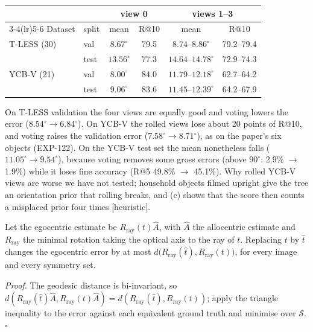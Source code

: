 \begin{center}\scriptsize\setlength{\tabcolsep}{3pt}
\begin{tabular}{@{}llcccc@{}}
\toprule
& & \multicolumn{2}{c}{view 0} & \multicolumn{2}{c}{views 1--3}\\
\cmidrule(lr){3-4}\cmidrule(lr){5-6}
Dataset & split & mean & R@10 & mean & R@10\\
\midrule
T-LESS (30) & val & $8.67^\circ$ & 79.5 & $8.74$--$8.86^\circ$ & 79.2--79.4\\
            & test & $13.56^\circ$ & 77.3 & $14.64$--$14.78^\circ$ & 72.9--74.3\\
YCB-V (21)  & val & $8.00^\circ$ & 84.0 & $11.79$--$12.18^\circ$ & 62.7--64.2\\
            & test & $9.06^\circ$ & 83.6 & $11.45$--$12.39^\circ$ & 64.2--67.9\\
\bottomrule
\end{tabular}
\end{center}
On T-LESS validation the four views are equally good and voting lowers the error ($8.54^\circ\to6.84^\circ$). On YCB-V the
rolled views lose about 20 points of R@10, and voting raises the validation error ($7.58^\circ\to8.71^\circ$), as on the paper's
six objects (EXP-122). On the YCB-V test set the mean nonetheless falls ($11.05^\circ\to9.54^\circ$), because voting removes some
gross errors (above $90^\circ$: 2.9\% $\to$ 1.9\%) while it loses fine accuracy (R@5 49.8\% $\to$ 45.1\%). Why rolled YCB-V
views are worse we have not tested; household objects filmed upright give the tree an orientation prior that rolling breaks,
and (c) shows that the score then counts a misplaced prior four times [heuristic].

\begin{proposition}\label{prop:allo}
Let the egocentric estimate be $R_{\mathrm{ray}}(t)\hat A$, with $\hat A$ the allocentric estimate and $R_{\mathrm{ray}}$ the minimal
rotation taking the optical axis to the ray of $t$. Replacing $t$ by $\hat t$ changes the egocentric error by at most
$d\big(R_{\mathrm{ray}}(\hat t),R_{\mathrm{ray}}(t)\big)$, for every image and every symmetry set.
\end{proposition}
\noindent\emph{Proof.} The geodesic distance is bi-invariant, so $d(R_{\mathrm{ray}}(\hat t)\hat A,R_{\mathrm{ray}}(t)\hat A)=d(R_{\mathrm{ray}}(\hat t),R_{\mathrm{ray}}(t))$;
apply the triangle inequality to the error against each equivalent ground truth and minimise over $\mathcal S$. \hfill$\square$

